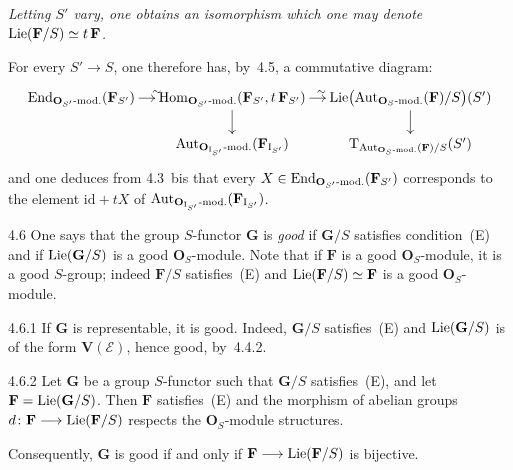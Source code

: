{\itshape
Letting \(S'\) vary, one obtains an isomorphism which one may denote
\(\operatorname{Lie}(\mathbf{F}/S)\simeq t\,\mathbf{F}\).

For every \(S'\to S\), one therefore has, by~4.5, a commutative diagram:
\[
\xymatrix@C=1.1em@R=1.5em{
\End_{\mathbf{O}_{S'}\textup{-mod.}}(\mathbf{F}_{S'}) \ar[r]^{\sim}
&
\Hom_{\mathbf{O}_{S'}\textup{-mod.}}(\mathbf{F}_{S'},t\,\mathbf{F}_{S'})
  \ar[r]^{\sim} \ar[d]
&
\Lie\bigl(\Aut_{\mathbf{O}_{S}\textup{-mod.}}(\mathbf{F})/S\bigr)(S') \ar[d]
\\
&
\Aut_{\mathbf{O}_{\mathrm{I}_{S'}}\textup{-mod.}}(\mathbf{F}_{\mathrm{I}_{S'}})
&
\mathrm{T}_{\Aut_{\mathbf{O}_{S}\textup{-mod.}}(\mathbf{F})/S}(S')
}
\]
and one deduces from 4.3~bis that every
\(X\in\operatorname{End}_{\mathbf{O}_{S'}\textup{-mod.}}(\mathbf{F}_{S'})\) corresponds to the element
\(\mathrm{id}+tX\) of
\(\operatorname{Aut}_{\mathbf{O}_{\mathrm{I}_{S'}}\textup{-mod.}}(\mathbf{F}_{\mathrm{I}_{S'}})\).
\par}

\begin{definition}{4.6}\label{II.4.6}
One says that the group \(S\)-functor \(\mathbf{G}\) is \emph{good} if \(\mathbf{G}/S\)
satisfies condition~(E) and if \(\operatorname{Lie}(\mathbf{G}/S)\) is a good
\(\mathbf{O}_{S}\)-module.
{\renewcommand{\thefootnote}{(73)}}
Note that if \(\mathbf{F}\) is a good \(\mathbf{O}_{S}\)-module, it is a good
\(S\)-group; indeed \(\mathbf{F}/S\) satisfies~(E) and
\(\operatorname{Lie}(\mathbf{F}/S)\simeq\mathbf{F}\) is a good \(\mathbf{O}_{S}\)-module.
\end{definition}

\begin{example}{4.6.1}\label{II.4.6.1}
If \(\mathbf{G}\) is representable, it is good. Indeed, \(\mathbf{G}/S\)
satisfies~(E) and \(\operatorname{Lie}(\mathbf{G}/S)\) is of the form \(\mathbf{V}(\mathcal{E})\),
hence good, by~4.4.2.
\end{example}

\begin{lemma}{4.6.2}\label{II.4.6.2}
{\renewcommand{\thefootnote}{(74)}}
Let \(\mathbf{G}\) be a group \(S\)-functor such that \(\mathbf{G}/S\) satisfies~(E),
and let \(\mathbf{F}=\operatorname{Lie}(\mathbf{G}/S)\). Then \(\mathbf{F}\) satisfies~(E) and the
morphism of abelian groups \(d\colon\mathbf{F}\longrightarrow\operatorname{Lie}(\mathbf{F}/S)\) respects the
\(\mathbf{O}_{S}\)-module structures.

Consequently, \(\mathbf{G}\) is good if and only if
\(\mathbf{F}\longrightarrow\operatorname{Lie}(\mathbf{F}/S)\) is bijective.
\end{lemma}

